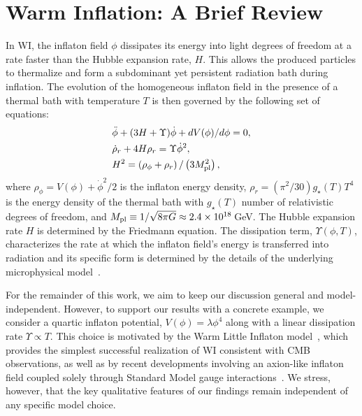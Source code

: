 \section{Warm Inflation: A Brief Review}
\label{sec:ch7-WIReview}
In WI, the inflaton field $\phi$ dissipates its energy into light degrees of freedom at a rate faster than the Hubble expansion rate, $H$. This allows the produced particles to thermalize and form a subdominant yet persistent radiation bath during inflation. The evolution of the homogeneous
inflaton field in the presence of a thermal bath with temperature $T$ is then governed by the following set of equations:
\begin{align}
    &\ddot{\phi}+(3H+\Upsilon)\dot{\phi}+dV(\phi)/d\phi=0,\label{eq:ch7-inflaton} \\
    & \dot{\rho}_r+4H\rho_r=\Upsilon \dot{\phi}^2,\label{eq:ch7-rhor} \\
    & H^2=\left(\rho_\phi+\rho_r\right)/\left(3 M_{\rm pl}^2\right),\label{eq:ch7-Hubble}
\end{align}
where $\rho_\phi=V(\phi)+\dot{\phi}^2/2$ is the inflaton energy density, $\rho_r=(\pi^2/30)g_\star(T)T^4$ is the energy density of the thermal bath with $g_\star(T)$ number of relativistic degrees of freedom, and $M_{\rm pl}\equiv 1/\sqrt{8\pi G}\approx 2.4 \times 10^{18}\,$GeV.  The Hubble expansion rate $H$ is determined by the Friedmann equation. The dissipation term, $\Upsilon(\phi,T)$, characterizes the rate at which the inflaton field's energy is transferred into radiation and its specific form is determined by the details of the underlying microphysical model~\cite{Berera:1998px}.

For the remainder of this work, we aim to keep our discussion general and model-independent. However, to support our results with a concrete example, we consider a quartic inflaton potential, $V(\phi)=\lambda \phi^4$ along with a linear dissipation rate $\Upsilon\propto T$. This choice is motivated by the Warm Little Inflaton model~\cite{Bastero-Gil:2016qru, Bastero-Gil:2019gao}, which provides the simplest successful realization of WI consistent with CMB observations, as well as by recent developments involving an axion-like inflaton field coupled solely through Standard Model gauge interactions~\cite{Berghaus:2025dqi}. We stress, however, that the key qualitative features of our findings remain independent of any specific model choice.

